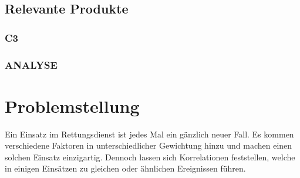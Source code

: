 \subsection{Relevante Produkte}
\subsubsection{\acrlong*{C3}}
\todo{}
%
\subsubsection{\acrlong*{ANALYSE}}
\todo{}

\section{Problemstellung}
\label{problem}
Ein Einsatz im Rettungsdienst ist jedes Mal ein gänzlich neuer Fall. 
Es kommen verschiedene Faktoren in unterschiedlicher Gewichtung hinzu und machen einen solchen Einsatz einzigartig. 
Dennoch lassen sich Korrelationen feststellen, welche in einigen Einsätzen zu gleichen oder ähnlichen Ereignissen führen.

